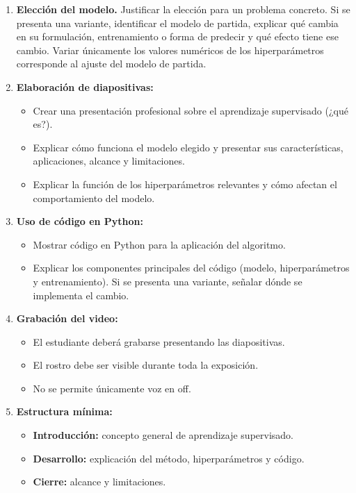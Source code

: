 \documentclass[a4,11pt]{aleph-notas}
\begin{document}
\begin{enumerate}[leftmargin=*]
    \item \textbf{Elección del modelo.} Justificar la elección para un problema concreto. Si se presenta una variante, identificar el modelo de partida, explicar qué cambia en su formulación, entrenamiento o forma de predecir y qué efecto tiene ese cambio. Variar únicamente los valores numéricos de los hiperparámetros corresponde al ajuste del modelo de partida.

    \item \textbf{Elaboración de diapositivas:}
    \begin{itemize}
        \item Crear una presentación profesional sobre el aprendizaje supervisado (¿qué es?).
        \item Explicar cómo funciona el modelo elegido y presentar sus características, aplicaciones, alcance y limitaciones.
        \item Explicar la función de los hiperparámetros relevantes y cómo afectan el comportamiento del modelo.
    \end{itemize}

    \item \textbf{Uso de código en Python:}
    \begin{itemize}
        \item Mostrar código en Python para la aplicación del algoritmo.
        \item Explicar los componentes principales del código (modelo, hiperparámetros y entrenamiento). Si se presenta una variante, señalar dónde se implementa el cambio.
    \end{itemize}

    \item \textbf{Grabación del video:}
    \begin{itemize}
        \item El estudiante deberá grabarse presentando las diapositivas.
        \item El rostro debe ser visible durante toda la exposición.
        \item No se permite únicamente voz en off.
    \end{itemize}

    \item \textbf{Estructura mínima:}
    \begin{itemize}
        \item \textbf{Introducción:} concepto general de aprendizaje supervisado.
        \item \textbf{Desarrollo:} explicación del método, hiperparámetros y código.
        \item \textbf{Cierre:} alcance y limitaciones.
    \end{itemize}


\end{enumerate}
\end{document}
